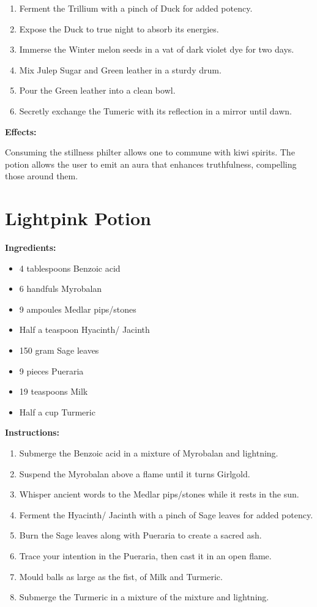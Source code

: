 \documentclass{article}
\begin{document}
\begin{enumerate}
  \item Ferment the Trillium with a pinch of Duck for added potency.
  \item Expose the Duck to true night to absorb its energies.
  \item Immerse the Winter melon seeds in a vat of dark violet dye for two days.
  \item Mix Julep Sugar and Green leather in a sturdy drum.
  \item Pour the Green leather into a clean bowl.
  \item Secretly exchange the Tumeric with its reflection in a mirror until dawn.
\end{enumerate}

\textbf{Effects:}

Consuming the stillness philter allows one to commune with kiwi spirits. The potion allows the user to emit an aura that enhances truthfulness, compelling those around them.

\newpage
\section*{Lightpink Potion}

\textbf{Ingredients:}

\begin{itemize}
  \item 4 tablespoons Benzoic acid
  \item 6 handfuls Myrobalan
  \item 9 ampoules Medlar pips/stones
  \item Half a teaspoon Hyacinth/ Jacinth
  \item 150 gram Sage leaves
  \item 9 pieces Pueraria
  \item 19 teaspoons Milk
  \item Half a cup Turmeric
\end{itemize}

\textbf{Instructions:}

\begin{enumerate}
  \item Submerge the Benzoic acid in a mixture of Myrobalan and lightning.
  \item Suspend the Myrobalan above a flame until it turns Girlgold.
  \item Whisper ancient words to the Medlar pips/stones while it rests in the sun.
  \item Ferment the Hyacinth/ Jacinth with a pinch of Sage leaves for added potency.
  \item Burn the Sage leaves along with Pueraria to create a sacred ash.
  \item Trace your intention in the Pueraria, then cast it in an open flame.
  \item Mould balls as large as the fist, of Milk and Turmeric.
  \item Submerge the Turmeric in a mixture of the mixture and lightning.
\end{enumerate}
\end{document}
